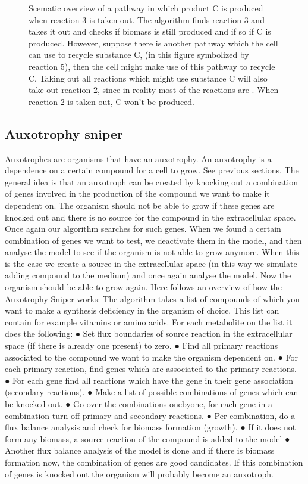 \documentclass[12pt]{report}
\begin{document}
\begin{figure}[hbtp]
  \centering
     
      \caption{Scematic overview of a pathway in which product C is produced when reaction 3 is taken out. The algorithm finds reaction 3 and takes it out and checks if biomass is still produced and if so if C is produced. However, suppose there is another pathway which the cell can use to recycle substance C, (in this figure symbolized by reaction 5), then the cell might make use of this pathway to recycle C. Taking out all reactions which might use substance C will also take out reaction 2, since in reality most of the reactions are . When reaction 2 is taken out, C won't be produced.}
  \label{fig:reaction-overview}
\end{figure}

\subsection{Auxotrophy sniper}
Auxotrophes are organisms that have an auxotrophy. An auxotrophy is a dependence on a certain compound for a cell to grow. See previous sections.
The general idea is that an auxotroph can be created by knocking out a combination of genes involved in the production of the compound we want to make it dependent on.
The organism should not be able to grow if these genes are knocked out and there is no source for the compound in the extracellular space.
Once again our algorithm searches for such genes. When we found a certain combination of genes we want to test, we deactivate them in the model, and then analyse the model to see if the organism is not able to grow anymore.
When this is the case we create a source in the extracellular space (in this way we simulate adding compound to the medium) and once again analyse the model. Now the organism should be able to grow again. Here follows an overview of how the Auxotrophy Sniper works: 
The algorithm takes a list of compounds of which you want to make a synthesis deficiency in the 
organism of choice. This list can contain for example vitamins or amino acids. For each 
metabolite on the list it does the following: 
● Set flux boundaries of source reaction in the extracellular space (if there is already one 
present) to zero. 
● Find all primary reactions associated to the compound we want to make the organism 
dependent on. 
● For each primary reaction, find genes which are associated to the primary reactions. 
● For each gene find all reactions which have the gene in their gene association 
(secondary reactions). 
● Make a list of possible combinations of genes which can be knocked out. 
● Go over the combinations one­by­one, for each gene in a combination turn off primary 
and secondary reactions. 
● Per combination, do a flux balance analysis and check for biomass formation (growth). 
● If it does not form any biomass, a source reaction of the compound is added to the 
model ●
Another flux balance analysis of the model is done and if there is biomass formation 
now, the combination of genes are good candidates. If this combination of genes is 
knocked out the organism will probably become an auxotroph.
\end{document}
